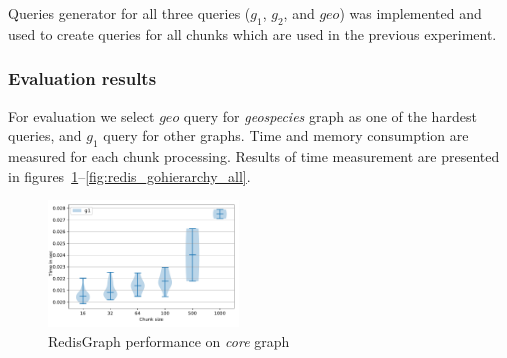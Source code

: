 \begin{algorithm}
\end{algorithm}

\begin{algorithm}
\end{algorithm}

Queries generator for all three queries ($g_1$, $g_2$, and $geo$) was implemented and used to create queries for all chunks which are used in the previous experiment. 


\subsubsection{Evaluation results}

For evaluation we select $geo$ query for \textit{geospecies} graph as one of the hardest queries, and $g_1$ query for other graphs.
Time and memory consumption are measured for each chunk processing.
Results of time measurement are presented in figures~\ref{fig:redis_core_all}--\ref{fig:redis_gohierarchy_all}.

\begin{figure}[h]
\centering
\includegraphics[width=0.45\textwidth]{data/raw_redis/core.pdf}
\caption{RedisGraph performance on \textit{core} graph}
\label{fig:redis_core_all}
\end{figure}


